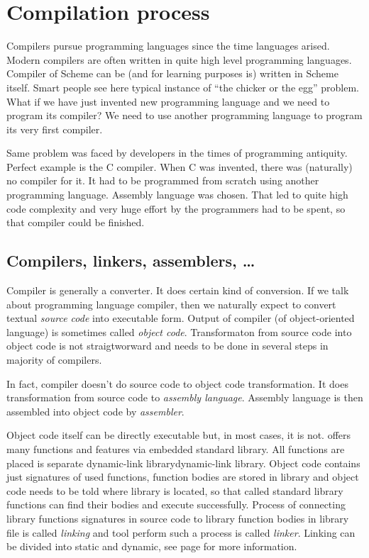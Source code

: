 \section{Compilation process}\label{section:compilation}
Compilers pursue programming languages since the time languages arised. Modern compilers are often written in quite high level programming languages. Compiler of Scheme can be (and for learning purposes is) written in Scheme itself. Smart people see here typical instance of \enquote{the chicker or the egg} problem. What if we have just invented new programming language and we need to program its compiler? We need to use another programming language to program its very first compiler.

Same problem was faced by developers in the times of programming antiquity. Perfect example is the C compiler. When C was invented, there was (naturally) no compiler for it. It had to be programmed from scratch using another programming language. Assembly language was chosen. That led to quite high code complexity and very huge effort by the programmers had to be spent, so that compiler could be finished.

\subsection{Compilers, linkers, assemblers, \ldots}
Compiler is generally a converter. It does certain kind of conversion. If we talk about programming language compiler, then we naturally expect to convert textual \textit{source code} into executable form. Output of compiler (of object-oriented language) is sometimes called \textit{object code}. Transformaton from source code into object code is not straigtworward and needs to be done in several steps in majority of \cpp compilers.

In fact, compiler doesn't do source code to object code transformation. It does transformation from source code to \textit{assembly language}. Assembly language is then assembled into object code by \textit{assembler}.

Object code itself can be directly executable but, in most cases, it is not. \cpp offers many functions and features via embedded standard library. All functions are placed is separate dynamic-link library{dynamic-link library}. Object code contains just signatures of used functions, function bodies are stored in library and object code needs to be told where library is located, so that called standard library functions can find their bodies and execute successfully. Process of connecting library functions signatures in source code to library function bodies in library file is called \textit{linking} and tool perform such a process is called \textit{linker}. Linking can be divided into static and dynamic, see page \pageref{listing:linking} for more information.

